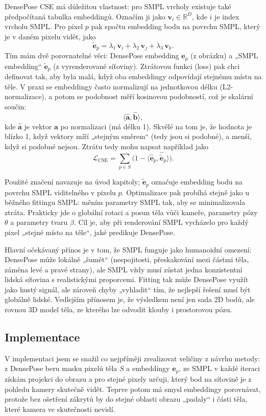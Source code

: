 \documentclass[11pt,a4paper,twoside,openright]{report}
\begin{document}
DensePose CSE má důležitou vlastnost: pro SMPL vrcholy existuje také předpočítaná tabulka embeddingů. Označím ji jako $\mathbf{v}_i \in \mathbb{R}^D$, kde $i$ je index vrcholu SMPL. Pro pixel $p$ pak spočtu embedding bodu na povrchu SMPL, který je v daném pixelu vidět, jako
\[
\tilde{\mathbf{e}}_p = \lambda_1\,\mathbf{v}_i + \lambda_2\,\mathbf{v}_j + \lambda_3\,\mathbf{v}_k.
\]
Tím mám dvě porovnatelné věci: DensePose embedding $\mathbf{e}_p$ (z obrázku) a „SMPL embedding“ $\tilde{\mathbf{e}}_p$ (z vyrenderované síťoviny).
Ztrátovou funkci (loss) pak chci definovat tak, aby byla malá, když oba embeddingy odpovídají stejnému místu na těle. V praxi se embeddingy často normalizují na jednotkovou délku (L2-normalizace), a potom se podobnost měří kosinovou podobností, což je skalární součin:
\[
\langle \hat{\mathbf{a}}, \hat{\mathbf{b}} \rangle,
\]
kde $\hat{\mathbf{a}}$ je vektor $\mathbf{a}$ po normalizaci (má délku 1). Skvělé na tom je, že hodnota je blízko 1, když vektory míří „stejným směrem“ (tedy jsou si podobné), a menší, když si podobné nejsou. Ztrátu tedy mohu napsat například jako
\[
\mathcal{L}_{\text{CSE}} = \sum_{p \in S} \bigl(1 - \langle \hat{\mathbf{e}}_p, \widehat{\tilde{\mathbf{e}}}_p \rangle \bigr).
\]

Použité značení navazuje na úvod kapitoly; $\tilde{\mathbf{e}}_p$ označuje embedding bodu na povrchu SMPL viditelného v pixelu $p$.
Optimalizace pak probíhá stejně jako u běžného fittingu SMPL: měním parametry SMPL tak, aby se minimalizovala ztráta. Prakticky jde o globální rotaci a posun těla vůči kameře, parametry pózy $\theta$ a parametry tvaru $\beta$. Cíl je, aby při renderování SMPL vycházelo pro každý pixel „stejné místo na těle“, jaké predikuje DensePose.

Hlavní očekávaný přínos je v tom, že SMPL funguje jako humanoidní omezení: DensePose může lokálně „šumět“ (nespojitosti, přeskakování mezi částmi těla, záměna levé a pravé strany), ale SMPL vždy musí zůstat jedna konzistentní lidská síťovina s realistickými proporcemi. Fitting tak může DensePose využít jako hustý signál, ale zároveň chyby „vyhladit“ tím, že nejlepší řešení musí být globálně lidské. Vedlejším přínosem je, že výsledkem není jen sada 2D bodů, ale rovnou 3D model těla, ze kterého lze odvodit klouby i prostorovou pózu.

\subsection{Implementace}

V implementaci jsem se snažil co nejpříměji zrealizovat veličiny z návrhu metody: z DensePose beru masku pixelů těla $S$ a embeddingy $\mathbf{e}_p$, ze SMPL v každé iteraci získám projekci do obrazu a pro stejné pixely určuji, který bod na síťovině je z pohledu kamery skutečně vidět. Teprve potom má smysl embeddingy porovnávat, protože bez ošetření zákrytů by do stejné oblasti obrazu „padaly“ i části těla, které kamera ve skutečnosti nevidí.
\end{document}
